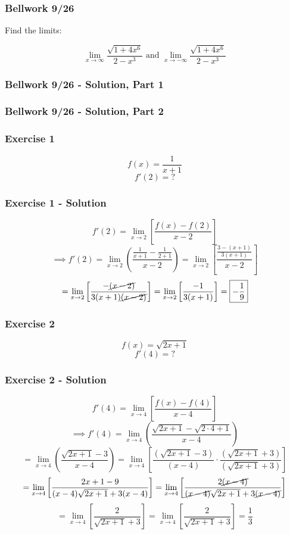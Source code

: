\documentclass[12pt]{beamer}
\begin{document}
\begin{frame}
	\frametitle{Bellwork 9/26}
	\initclock

	\vfill
	\vfill
	\Large
	Find the limits:\par
	\[\displaystyle\lim_{x\to \infty}\frac{\sqrt{1+4x^6}}{2-x^3}\text{ and }\displaystyle\lim_{x\to -\infty}\frac{\sqrt{1+4x^6}}{2-x^3}\]
	\vfill
	\vfill
	\vfill

	\small
	\crono
\end{frame}
\begin{frame}
	\frametitle{Bellwork 9/26 - Solution, Part 1}


\end{frame}\begin{frame}
	\frametitle{Bellwork 9/26 - Solution, Part 2}


\end{frame}
\begin{frame}
	\frametitle{Exercise 1}

	\vfill
	\LARGE
	\[f(x) = \frac{1}{x+1}\]
	\vfill
	\Large
	\[f'(2)=\text{?}\]
	\vfill
	\vfill
\end{frame}
\begin{frame}
	\frametitle{Exercise 1 - Solution}

	\large %
	\[f'(2)=\displaystyle\lim_{x\to2}\left[\frac{f(x)-f(2)}{x-2}\right]\]
	\[\implies f'(2)=\displaystyle\lim_{x\to2}\left(\frac{\frac{1}{x+1}-\frac{1}{2+1}}{x-2}\right)=\displaystyle\lim_{x\to2}\left[\frac{\frac{3-(x+1)}{3(x+1)}}{x-2}\right]\]
	\[=\displaystyle\lim_{x\to2}\left[\frac{-\cancel{(x-2)}}{3(x+1)\cancel{(x-2)}}\right]=\displaystyle\lim_{x\to2}\left[\frac{-1}{3(x+1)}\right]=\boxed{-\frac{1}{9}}\]
\end{frame}
\begin{frame}
	\frametitle{Exercise 2}

	\vfill
	\LARGE
	\[f(x) = \sqrt{2x+1}\]
	\vfill
	\Large
	\[f'(4)=\text{?}\]
	\vfill
	\vfill
\end{frame}
\begin{frame}
	\frametitle{Exercise 2 - Solution}

	\large
	\[f'(4)=\displaystyle\lim_{x\to4}\left[\frac{f(x)-f(4)}{x-4}\right]\]
	\vfill
	\small
	\[\implies f'(4)=\displaystyle\lim_{x\to4}\left(\frac{\sqrt{2x+1}-\sqrt{2\cdot4+1}}{x-4}\right)\]
	\[=\displaystyle\lim_{x\to4}\left(\frac{\sqrt{2x+1}-3}{x-4}\right)=\displaystyle\lim_{x\to4}\left[\frac{(\sqrt{2x+1}-3)}{(x-4)}\cdot \frac{(\sqrt{2x+1}+3)}{(\sqrt{2x+1}+3)}\right]\]
	\tiny
	\[=\displaystyle\lim_{x\to4}\left[\frac{2x+1-9}{(x-4)\sqrt{2x+1}+3(x-4)}\right]=\displaystyle\lim_{x\to4}\left[\frac{2\cancel{(x-4)}}{\cancel{(x-4)}\sqrt{2x+1}+3\cancel{(x-4)}}\right]\]
	\small
	\[=\displaystyle\lim_{x\to4}\left[\frac{2}{\sqrt{2x+1}+3}\right]=\displaystyle\lim_{x\to4}\left[\frac{2}{\sqrt{2x+1}+3}\right]=\boxed{\frac{1}{3}}\]
	\vfill
\end{frame}
\end{document}
